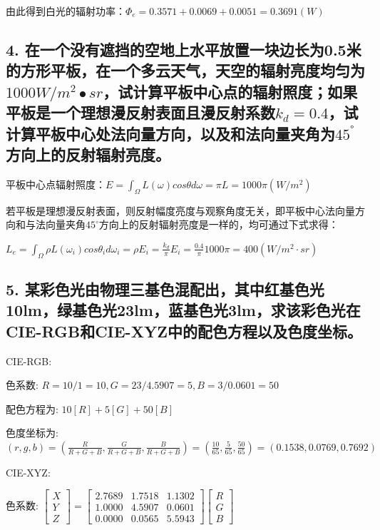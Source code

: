 \documentclass[]{article}
\begin{document}
由此得到白光的辐射功率：\(\Phi_e=0.3571+0.0069+0.0051=0.3691(W)\)

\hypertarget{header-n4}{%
\subsection{4. 在一个没有遮挡的空地上水平放置一块边长为0.5米的方形平板，在一个多云天气，天空的辐射亮度均匀为$1000W/m^2∙sr$，试计算平板中心点的辐射照度；如果平板是一个理想漫反射表面且漫反射系数$k_d=0.4$，试计算平板中心处法向量方向，以及和法向量夹角为$45^°$方向上的反射辐射亮度。}\label{header-n4}}

平板中心点辐射照度：\(E=\int_{\Omega}L(\omega)cos\theta d\omega=\pi L=1000\pi (W/m^2)\)

若平板是理想漫反射表面，则反射幅度亮度与观察角度无关，即平板中心法向量方向和与法向量夹角\(45^\circ\)方向上的反射辐射亮度是一样的，均可通过下式求得：

\(L_e=\int_{\Omega}\rho L(\omega_i)cos\theta_i d\omega_i=\rho E_i=\frac{k_d}{\pi}E_i=\frac{0.4}{\pi}1000\pi=400(W/m^2\cdot sr)\)

\hypertarget{header-n80}{%
\subsection{5. 某彩色光由物理三基色混配出，其中红基色光10lm，绿基色光23lm，蓝基色光3lm，求该彩色光在CIE-RGB和CIE-XYZ中的配色方程以及色度坐标。}\label{header-n80}}

CIE-RGB:

色系数: \(R=10/1=10,G=23/4.5907=5,B=3/0.0601=50\)

配色方程为: \(10[R]+5[G]+50[B]\)

色度坐标为:
\((r,g,b)=(\frac{R}{R+G+B},\frac{G}{R+G+B},\frac{B}{R+G+B})=(\frac{10}{65},\frac{5}{65},\frac{50}{65})=(0.1538,0.0769,0.7692)\)

CIE-XYZ:

色系数:
\(\begin{bmatrix}X \\Y \\ Z\end{bmatrix}=\begin{bmatrix}2.7689 & 1.7518 & 1.1302 \\1.0000 & 4.5907 & 0.0601 \\ 0.0000 & 0.0565 & 5.5943 \end{bmatrix}\begin{bmatrix}R \\ G \\ B\end{bmatrix}\)
\end{document}
